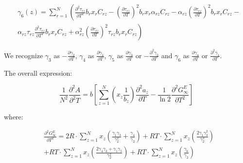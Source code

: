 \documentclass[a4paper, 12pt, english, sintefheadings, sintefcolour]{sintefmemo}
\begin{document}
\begin{equation}
\begin{split}
&\gamma_6(z)=\sum_{r=1}^N\left(\frac{\partial^2 \tau_{rz}}{\partial T^2}b_rx_rC_{rz}-(\frac{\partial \tau_{rz}}{\partial T})^2b_rx_r\alpha_{rz}C_{rz}-\alpha_{rz}(\frac{\partial \tau_{rz}}{\partial T})^2b_rx_rC_{rz}-\right. \\
&\left.\alpha_{rz}\tau_{rz}\frac{\partial^2\tau_{rz}}{\partial T^2}b_rx_rC_{rz}+\alpha_{rz}^2(\frac{\partial \tau_{rz}}{\partial T})^2\tau_{rz}b_rx_rC_{rz}\right)
\end{split}
\end{equation}

We recognize $\gamma_3$ as $-\frac{\partial \gamma_2}{\partial T}$, $\gamma_4$
as $\frac{\partial \gamma_1}{\partial T}$, $\gamma_5$ as $\frac{\partial
  \gamma_3}{\partial T}$ or $-\frac{\partial^2\gamma_2}{\partial T}$ and
$\gamma_6$ as $\frac{\partial \gamma_4}{\partial T }$ or
$\frac{\partial^2\gamma_1}{\partial T}$.


The overall expression:

\begin{equation}
\frac{1}{N^2}\frac{\partial^2 A}{\partial ^2T}=b\left[\sum_{z=1}^N\left(x_z\frac{1}{b_z}\right)\frac{\partial^2 a_z}{\partial T}-\frac{1}{\ln{2}}\frac{\partial^2 G_{\infty}^E}{\partial T^2}\right]
\end{equation}

where:


\begin{equation}
\begin{split}
&\frac{\partial^2 G_{\infty}^E}{\partial T^2}=2R\cdot\sum_{z=1}^N x_z\left(\frac{\gamma_1\gamma_3}{\gamma_2^2}+\frac{\gamma_4}{\gamma_2}\right)+
RT \cdot \sum_{z=1}^N x_z\left(\frac{2\gamma_1\gamma_3^2}{\gamma_2^3}\right) \\
&+RT \cdot \sum_{z=1}^N x_z\left(\frac{2\gamma_4 \gamma_3 + \gamma_1\gamma_5}{\gamma_2^2}\right) + RT \cdot \sum_{z=1}^N x_z\left(\frac{\gamma_6}{\gamma_2}\right)
\end{split}
\end{equation}
\end{document}
